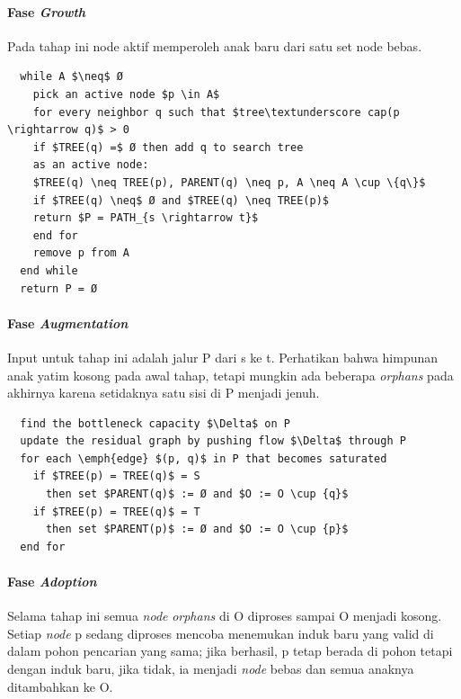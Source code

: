 \paragraph{Fase \emph{Growth}} \label{fase_growth}

Pada tahap ini node aktif memperoleh anak baru dari satu set node bebas.

\begin{lstlisting}
  while A $\neq$ Ø
    pick an active node $p \in A$
    for every neighbor q such that $tree\textunderscore cap(p \rightarrow q)$ > 0
    if $TREE(q) =$ Ø then add q to search tree 
    as an active node:
    $TREE(q) \neq TREE(p), PARENT(q) \neq p, A \neq A \cup \{q\}$
    if $TREE(q) \neq$ Ø and $TREE(q) \neq TREE(p)$ 
    return $P = PATH_{s \rightarrow t}$
    end for
    remove p from A
  end while
  return P = Ø
\end{lstlisting}


\paragraph{Fase \emph{Augmentation}} \label{fase_augmentation}

Input untuk tahap ini adalah jalur P dari s ke t. Perhatikan bahwa himpunan anak 
yatim kosong pada awal tahap, tetapi mungkin ada beberapa \emph{orphans} pada akhirnya 
karena setidaknya satu sisi di P menjadi jenuh.

\begin{lstlisting}
  find the bottleneck capacity $\Delta$ on P
  update the residual graph by pushing flow $\Delta$ through P
  for each \emph{edge} $(p, q)$ in P that becomes saturated
    if $TREE(p) = TREE(q)$ = S 
      then set $PARENT(q)$ := Ø and $O := O \cup {q}$
    if $TREE(p) = TREE(q)$ = T 
      then set $PARENT(p)$ := Ø and $O := O \cup {p}$
  end for
\end{lstlisting}


\paragraph{Fase \emph{Adoption}} \label{fase_adoption}

Selama tahap ini semua \emph{node} \emph{orphans} di O diproses sampai O menjadi kosong. 
Setiap \emph{node} p sedang diproses mencoba menemukan induk baru yang valid di dalam pohon 
pencarian yang sama; jika berhasil, p tetap berada di pohon tetapi dengan induk baru, 
jika tidak, ia menjadi \emph{node} bebas dan semua anaknya ditambahkan ke O.

